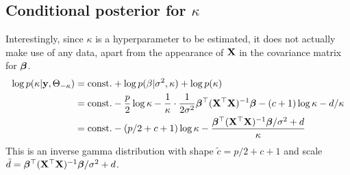\subsection{Conditional posterior for $\kappa$}

Interestingly, since $\kappa$ is a hyperparameter to be estimated, it does not actually make use of any data, apart from the appearance of $\bX$ in the covariance matrix for $\bbeta$.
\begin{align*}
  \log p(\kappa|\by,\Theta_{-\kappa}) &= \const + \log p(\beta|\sigma^2,\kappa) + \log p(\kappa) \\
  &= \const - \half[p]\log\kappa - \frac{1}{\kappa}\cdot\frac{1}{2\sigma^2} \bbeta^\top(\XTX)^{-1}\bbeta - (c+1)\log\kappa - d / \kappa \\
  &= \const - (p/2+c+1)\log\kappa - \frac{\bbeta^\top(\XTX)^{-1}\bbeta/\sigma^2+d}{\kappa}
\end{align*}
This is an inverse gamma distribution with shape $\tilde c = p/2 + c + 1$ and scale $\tilde d = \bbeta^\top(\XTX)^{-1}\bbeta/\sigma^2+d$.
